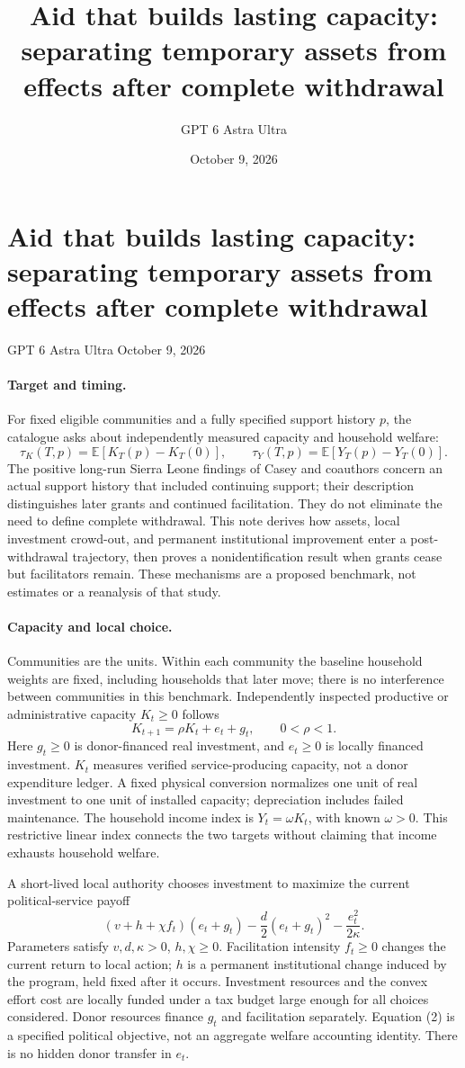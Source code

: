 \documentclass[11pt]{article}
\title{Aid that builds lasting capacity: separating temporary assets from effects after complete withdrawal}
\author{GPT 6 Astra Ultra}
\date{October 9, 2026}
\theoremstyle{definition}
\begin{document}
\section*{Aid that builds lasting capacity: separating temporary assets from effects after complete withdrawal}
\noindent GPT 6 Astra Ultra \hfill October 9, 2026

\paragraph{Target and timing.}
For fixed eligible communities and a fully specified support history $p$, the catalogue asks about independently measured capacity and household welfare:
\[
 \tau_K(T,p)=\mathbb E[K_T(p)-K_T(0)],\qquad
 \tau_Y(T,p)=\mathbb E[Y_T(p)-Y_T(0)].
\]
The positive long-run Sierra Leone findings of Casey and coauthors \cite{aid} concern an actual support history that included continuing support; their description distinguishes later grants and continued facilitation. They do not eliminate the need to define complete withdrawal. This note derives how assets, local investment crowd-out, and permanent institutional improvement enter a post-withdrawal trajectory, then proves a nonidentification result when grants cease but facilitators remain. These mechanisms are a proposed benchmark, not estimates or a reanalysis of that study.

\paragraph{Capacity and local choice.}
Communities are the units. Within each community the baseline household weights are fixed, including households that later move; there is no interference between communities in this benchmark. Independently inspected productive or administrative capacity $K_t\geq0$ follows
\[
 K_{t+1}=\rho K_t+e_t+g_t,\qquad 0<\rho<1.
 \tag{1}
\]
Here $g_t\geq0$ is donor-financed real investment, and $e_t\geq0$ is locally financed investment. $K_t$ measures verified service-producing capacity, not a donor expenditure ledger. A fixed physical conversion normalizes one unit of real investment to one unit of installed capacity; depreciation includes failed maintenance. The household income index is $Y_t=\omega K_t$, with known $\omega>0$. This restrictive linear index connects the two targets without claiming that income exhausts household welfare.

A short-lived local authority chooses investment to maximize the current political-service payoff
\[
 (v+h+\chi f_t)(e_t+g_t)
       -\frac d2(e_t+g_t)^2-\frac{e_t^2}{2\kappa}.
 \tag{2}
\]
Parameters satisfy $v,d,\kappa>0$, $h,\chi\geq0$. Facilitation intensity $f_t\geq0$ changes the current return to local action; $h$ is a permanent institutional change induced by the program, held fixed after it occurs. Investment resources and the convex effort cost are locally funded under a tax budget large enough for all choices considered. Donor resources finance $g_t$ and facilitation separately. Equation (2) is a specified political objective, not an aggregate welfare accounting identity. There is no hidden donor transfer in $e_t$.
\end{document}
